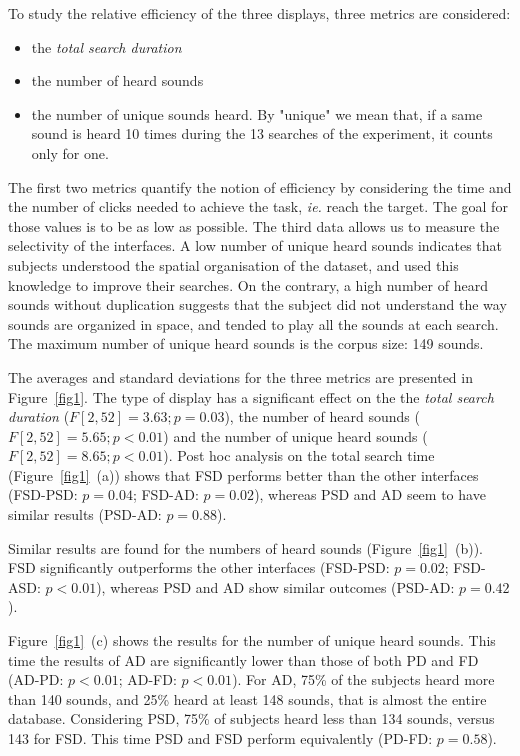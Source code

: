 \documentclass{aes2e}
\begin{document}
To study the relative efficiency of the three displays, three metrics are considered: 

\begin{itemize}
\item the \textit{total search duration}
\item the number of heard sounds
\item the number of unique sounds heard. By "unique" we mean that, if a same sound is heard 10 times during the 13 searches of the  experiment, it counts only for one. 
\end{itemize}

The first two metrics quantify the notion of efficiency by considering the time and the number of clicks needed to achieve the task, \textit{ie.} reach the target. The goal for those values is to be as low as possible. The third data allows us to measure the selectivity of the interfaces. A low number of unique heard sounds indicates that subjects understood the spatial organisation of the dataset, and used this knowledge to improve their searches. On the contrary, a high number of heard sounds without duplication suggests that the subject did not understand the way sounds are organized in space, and tended to play all the sounds at each search. The maximum number of unique heard sounds is the corpus size: 149 sounds.

The averages and standard deviations for the three metrics are presented in Figure~\ref{fig1}. The type of display has a significant effect on the the \textit{total search duration} ($F[2,52]=3.63; p=0.03$), the number of heard sounds ($F[2,52]=5.65; p<0.01$) and the number of unique heard sounds ($F[2,52]=8.65; p<0.01$). Post hoc analysis on the total search time (Figure~\ref{fig1}~(a)) shows that FSD performs better than the other interfaces (FSD-PSD: $p=0.04$; FSD-AD: $p=0.02$), whereas PSD and AD seem to have similar results (PSD-AD: $p=0.88$).

Similar results are found for the numbers of heard sounds (Figure~\ref{fig1}~(b)). FSD significantly outperforms the other interfaces (FSD-PSD: $p=0.02$; FSD-ASD: $p<0.01$), whereas PSD and AD show similar outcomes (PSD-AD: $p=0.42$).

Figure~\ref{fig1}~(c) shows the results for the number of unique heard sounds. This time the results of AD are significantly lower than those of both PD and FD (AD-PD: $p<0.01$; AD-FD: $p<0.01$).  For AD, 75\% of the subjects heard more than 140 sounds, and 25\% heard at least 148 sounds, that is almost the entire database. Considering PSD, 75\% of subjects heard less than 134 sounds, versus 143 for FSD. This time PSD and FSD perform equivalently (PD-FD: $p=0.58$).
\end{document}
